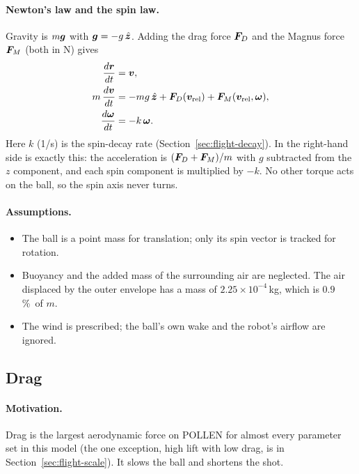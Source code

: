 \paragraph{Newton's law and the spin law.}
Gravity is $m\bm{g}$ with $\bm{g} = -g\,\hat{\bm{z}}$.
Adding the drag force $\bm{F}_D$ and the Magnus force $\bm{F}_M$ (both in \unit{N}) gives
\begin{align}
  \frac{d\bm{r}}{dt} &= \bm{v}, \label{eq:flight-eom-r}\\
  m\,\frac{d\bm{v}}{dt} &= -m g\,\hat{\bm{z}} + \bm{F}_D(\bm{v}_{\mathrm{rel}}) + \bm{F}_M(\bm{v}_{\mathrm{rel}},\bm{\omega}), \label{eq:flight-eom-v}\\
  \frac{d\bm{\omega}}{dt} &= -k\,\bm{\omega}. \label{eq:flight-eom-w}
\end{align}
Here $k$ (\unit{1/s}) is the spin-decay rate (Section~\ref{sec:flight-decay}).
In  the right-hand side is exactly this:
the acceleration is $(\bm{F}_D+\bm{F}_M)/m$ with $g$ subtracted from the $z$ component,
and each spin component is multiplied by $-k$.
No other torque acts on the ball, so the spin axis never turns.

\paragraph{Assumptions.}
\begin{itemize}
  \item The ball is a point mass for translation; only its spin vector is tracked for rotation.
  \item Buoyancy and the added mass of the surrounding air are neglected.
    The air displaced by the outer envelope has a mass of $2.25\times10^{-4}$\,\unit{kg}\derived,
    which is $0.9$\,\%\derived\ of $m$.
  \item The wind is prescribed; the ball's own wake and the robot's airflow are ignored.
\end{itemize}

\subsection{Drag}
\label{sec:flight-drag}

\paragraph{Motivation.}
Drag is the largest aerodynamic force on POLLEN for almost every parameter set in this model
(the one exception, high lift with low drag, is in Section~\ref{sec:flight-scale}).
It slows the ball and shortens the shot.

